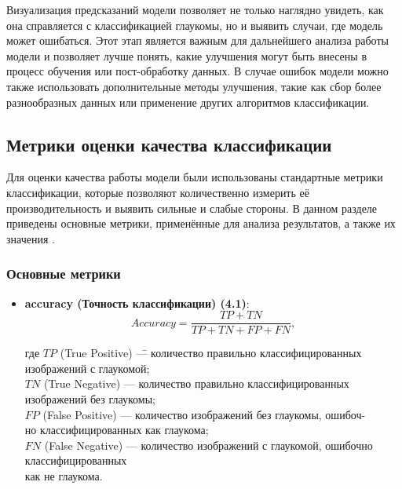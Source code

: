 {    Визуализация предсказаний модели позволяет не только наглядно увидеть, как она справляется с классификацией глаукомы, но и выявить случаи, где модель может ошибаться. Этот этап является важным для дальнейшего анализа работы модели и позволяет лучше понять, какие улучшения могут быть внесены в процесс обучения или пост-обработку данных. В случае ошибок модели можно также использовать дополнительные методы улучшения, такие как сбор более разнообразных данных или применение других алгоритмов классификации.


    \subsection{Метрики оценки качества классификации}

    Для оценки качества работы модели были использованы стандартные метрики классификации, которые позволяют количественно измерить её производительность и выявить сильные и слабые стороны. В данном разделе приведены основные метрики, применённые для анализа результатов, а также их значения \cite{metrics}.

    \subsubsection*{Основные метрики}

    \begin{itemize}
        \item \textbf{accuracy (Точность классификации) (4.1)}:
            \[
            Accuracy = \frac{TP + TN}{TP + TN + FP + FN}, \tag{4.1}
            \]
            \begin{tabbing}
                где 
                \=\(TP\) (True Positive) \= — количество правильно классифицированных \\ изображений с глаукомой; \\
                \>\(TN\) (True Negative) \> — количество правильно классифицированных \\ изображений без глаукомы; \\
                \>\(FP\) (False Positive) \> — количество изображений без глаукомы, ошибоч- \\ но классифицированных как глаукома; \\
                \>\(FN\) (False Negative) \> — количество изображений с глаукомой, ошибочно \\ классифицированных \\ как не глаукома.
            \end{tabbing}
        

\end{itemize}}
